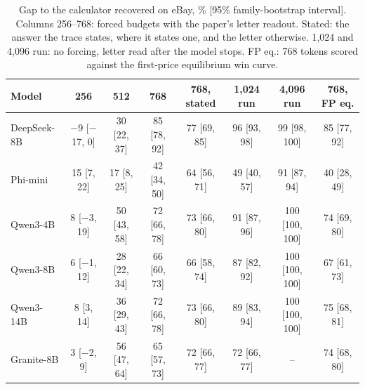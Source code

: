 \begin{table}[t]
\caption{Gap to the calculator recovered on eBay, \% [95\% family-bootstrap interval]. Columns 256--768: forced budgets with the paper's letter readout. Stated: the answer the trace states, where it states one, and the letter otherwise. 1,024 and 4,096 run: no forcing, letter read after the model stops. FP eq.: 768 tokens scored against the first-price equilibrium win curve.}
\label{tab:gapebay}
\footnotesize
\centering
\setlength{\tabcolsep}{4pt}
\begin{tabular}{lccccccc}
\toprule
Model & 256 & 512 & 768 & 768, stated & 1,024 run & 4,096 run & 768, FP eq. \\
\midrule
DeepSeek-8B & $-$9 [$-$17, 0] & 30 [22, 37] & 85 [78, 92] & 77 [69, 85] & 96 [93, 98] & 99 [98, 100] & 85 [77, 92] \\
Phi-mini & 15 [7, 22] & 17 [8, 25] & 42 [34, 50] & 64 [56, 71] & 49 [40, 57] & 91 [87, 94] & 40 [28, 49] \\
Qwen3-4B & 8 [$-$3, 19] & 50 [43, 58] & 72 [66, 78] & 73 [66, 80] & 91 [87, 96] & 100 [100, 100] & 74 [69, 80] \\
Qwen3-8B & 6 [$-$1, 12] & 28 [22, 34] & 66 [60, 73] & 66 [58, 74] & 87 [82, 92] & 100 [100, 100] & 67 [61, 73] \\
Qwen3-14B & 8 [3, 14] & 36 [29, 43] & 72 [66, 78] & 73 [66, 80] & 89 [83, 94] & 100 [100, 100] & 75 [68, 81] \\
Granite-8B & 3 [$-$2, 9] & 56 [47, 64] & 65 [57, 73] & 72 [66, 77] & 72 [66, 77] & -- & 74 [68, 80] \\
\bottomrule
\end{tabular}
\end{table}
